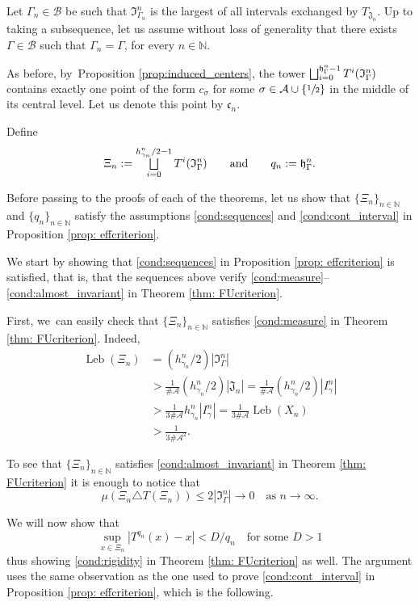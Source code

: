 \documentclass[10pt,a4paper]{amsart}
\let\oldbigsqcup\bigsqcup
\renewcommand{\bigsqcup}{\mathop{\textstyle\oldbigsqcup}\displaylimits}
\DeclareMathOperator{\Leb}{Leb}
\theoremstyle{plain}
\theoremstyle{definition}
\newcommand{\A}{\mathcal{A}}
\newcommand{\B}{\mathcal{B}}
\newcommand{\N}{\mathbb{N}}
\begin{document}
Let $\Gamma_n \in \B$ be such that $\mathfrak I_{\Gamma_n}^n$ is the largest of all intervals exchanged by $T_{\mathfrak J_n}$. Up to taking a subsequence, let us assume without loss of generality that there exists $\Gamma \in \B$ such that $\Gamma_n = \Gamma$, for every $n \in \N$.

As before, by~Proposition \ref{prop:induced_centers}, the tower $\bigsqcup_{i=0}^{\mathfrak h_{\Gamma}^n-1}T^i(\mathfrak I_{\Gamma}^n)$ contains exactly one point of the form $c_{\sigma}$ for some $\sigma \in \A \cup \{\sfrac{1}{2}\}$ in the middle of its central level. Let us denote this point by $\mathfrak c_n$.

Define
\[
\Xi_n:=\bigsqcup_{i=0}^{h_{\gamma_n}^n/2-1}T^{i}(\mathfrak I_{\Gamma}^n)\qquad \text{and}\qquad q_n:=\mathfrak h_{\Gamma}^n.
\]

Before passing to the proofs of each of the theorems, let us show that $\{\Xi_n\}_{n\in\N}$ and $\{q_n\}_{n\in\N}$ satisfy the assumptions \eqref{cond:sequences} and \eqref{cond:cont_interval} in Proposition \ref{prop: effcriterion}.

We start by showing that \eqref{cond:sequences} in Proposition \ref{prop: effcriterion} is satisfied, that is, that the sequences above verify \eqref{cond:measure}--\eqref{cond:almost_invariant} in Theorem \ref{thm: FUcriterion}.

First, we~can easily check that $\{\Xi_n\}_{n \in \N}$ satisfies \eqref{cond:measure} in Theorem \ref{thm: FUcriterion}. Indeed,
\begin{align*}
\Leb(\Xi_n) & =(h_{\gamma_n}^n/2)|\mathfrak I_{\Gamma}^n| \\ & > \frac{1}{\#\A}(h_{\gamma_n}^n/2)|\mathfrak J_n|=\frac{1}{\#\A}(h_{\gamma_n}^n/2)|I^n_{\gamma}| \\
& > \frac{1}{3\#\A} h_{\gamma_n}^n|I^n_{\gamma}|=\frac{1}{3\#\A} \Leb(X_n) \\
& >\frac{1}{3\#\A^2}.
\end{align*}

To see that $\{\Xi_n\}_{n\in\N}$ satisfies \eqref{cond:almost_invariant} in Theorem \ref{thm: FUcriterion} it is enough to notice that
\[
\mu(\Xi_n\triangle T(\Xi_n))\le 2|\mathfrak I_{\Gamma}^n|\to 0 \quad\text{as }n\to\infty.
\]

We will now show that
\begin{equation}\label{eq: derbound}
\sup_{x\in\Xi_n}|T^{q_n}(x)-x|<D/q_n\quad\text{for some }D>1
\end{equation}
thus showing \eqref{cond:rigidity} in Theorem \ref{thm: FUcriterion} as well. The argument uses the same observation as the one used to prove \eqref{cond:cont_interval} in Proposition \ref{prop: effcriterion}, which is the following.
\end{document}
